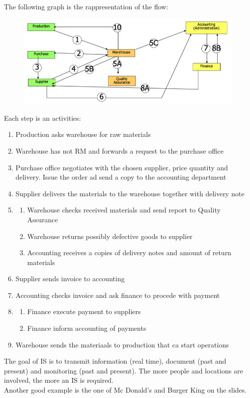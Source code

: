 \documentclass[12pt]{article}
\begin{document}
The following graph is the rappresentation of the flow:
\begin{figure}[H]
  \includegraphics[width=\linewidth]{images/flow.png}
  \label{fig:flow}
\end{figure}
Each step is an activities:
\begin{enumerate}
  \item Production asks warehouse for raw materials
  \item Warehouse has not RM and forwards a request to the purchase office
  \item Purchase office negotiates with the chosen supplier, price quantity and delivery. Issue the order ad send a copy to the accounting department
  \item Supplier delivers the materials to the warehouse together with delivery note
  \item \begin{enumerate}
    \item Warehouse checks received materials and send report to Quality Assurance
    \item Warehouse returns possibly defective goods to supplier
    \item Accounting receives a copies of delivery notes and amount of return materials
  \end{enumerate}
  \item Supplier sends invoice to accounting
  \item Accounting checks invoice and ask finance to procede with payment
  \item \begin{enumerate}
    \item Finance execute payment to suppliers
    \item Finance inform accounting of payments
  \end{enumerate}
  \item Warehouse sends the materiaals to production that ca start operations
\end{enumerate}
The goal of IS is to transmit information (real time), document (past and present) and monitoring (past and present). The more people and locations are involved, the more an IS is required.\\
Another good example is the one of Mc Donald's and Burger King on the slides.\\
\end{document}
